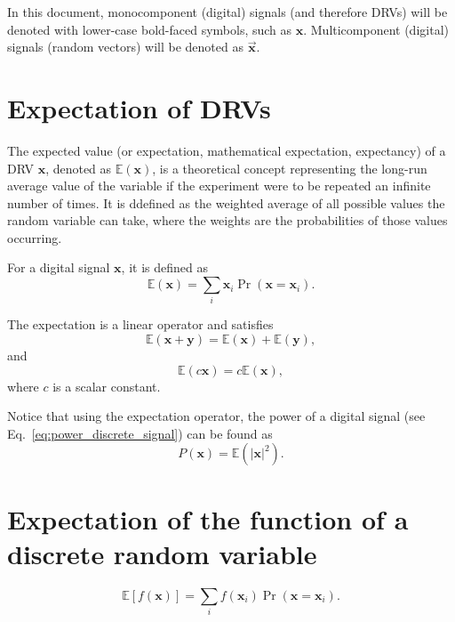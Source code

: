 In this document, monocomponent (digital) signals (and therefore
\glspl{DRV}) will be denoted with lower-case bold-faced symbols,
such as $\mathbf{x}$. Multicomponent (digital) signals (random
vectors) will be denoted as $\overrightarrow{\mathbf{x}}$.


\section{Expectation of \glspl{DRV}}
The expected value (or expectation, mathematical expectation,
expectancy) of a \gls{DRV} $\mathbf{x}$, denoted as
$\mathbb{E}(\mathbf{x})$, is a theoretical concept representing the
long-run average value of the variable if the experiment were to be
repeated an infinite number of times. It is ddefined as the weighted
average of all possible values the random variable can take, where the
weights are the probabilities of those values occurring.

For a digital signal $\mathbf{x}$, it is defined as
\begin{equation}
  \mathbb{E}(\mathbf{x})=\sum_i\mathbf{x}_i\Pr(\mathbf{x}=\mathbf{x}_i).
  \label{eq:expectation}
\end{equation}

The expectation is a linear operator and satisfies
\begin{equation}
  \mathbb{E}(\mathbf{x}+\mathbf{y}) = \mathbb{E}(\mathbf{x}) + \mathbb{E}(\mathbf{y}),
\end{equation}
and
\begin{equation}
  \mathbb{E}(c\mathbf{x}) = c\mathbb{E}(\mathbf{x}),
\end{equation}
where $c$ is a scalar constant.

Notice that using the expectation operator, the power of a digital
signal (see Eq.~\ref{eq:power_discrete_signal}) can be found as
\begin{equation}
  P(\mathbf{x}) = \mathbb{E}(|\mathbf{x}|^2).
  \label{eq:power_as_expectation}
\end{equation}

\section{Expectation of the function of a discrete random variable}
\begin{equation}
  \mathbb{E}[f(\mathbf{x})]=\sum_if(\mathbf{x}_i)\Pr(\mathbf{x}=\mathbf{x}_i).
  \label{eq:expectation_of_function}
\end{equation}

